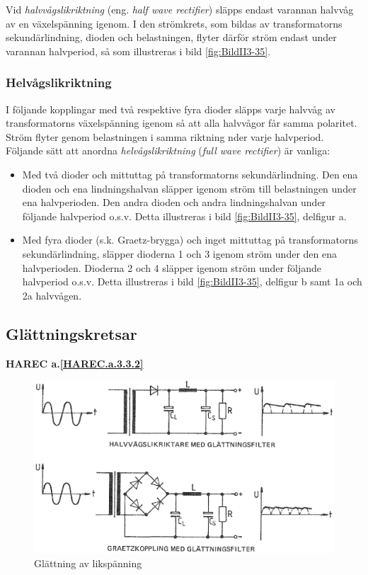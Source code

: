 Vid \emph{halvvågslikriktning} (eng. \emph{half wave rectifier}) släpps endast
varannan halvvåg av en växelspänning igenom.
I den strömkrets, som bildas av transformatorns sekundärlindning, dioden och
belastningen, flyter därför ström endast under varannan halvperiod, så som
illustreras i bild \ref{fig:BildII3-35}.

\subsubsection{Helvågslikriktning}

I följande kopplingar med två respektive fyra dioder släpps varje halvvåg av
transformatorns växelspänning igenom så att alla halvvågor får samma polaritet.
Ström flyter genom belastningen i samma riktning nder varje halvperiod.
Följande sätt att anordna \emph{helvågslikriktning}
(\emph{full wave rectifier}) är vanliga:
\begin{itemize}
\item Med två dioder och mittuttag på transformatorns sekundärlindning.
  Den ena dioden och ena lindningshalvan släpper igenom ström till belastningen
  under ena halvperioden.
  Den andra dioden och andra lindningshalvan under följande halvperiod o.s.v.
  Detta illustreras i bild \ref{fig:BildII3-35}, delfigur a.

\item Med fyra dioder (s.k. Graetz-brygga) och inget mittuttag på
  transformatorns sekundärlindning, släpper dioderna 1 och 3 igenom
  ström under den ena halvperioden.
  Dioderna 2 och 4 släpper igenom ström under följande halvperiod o.s.v.
  Detta illustreras i bild \ref{fig:BildII3-35}, delfigur b samt 1a och 2a
  halvvågen.
\end{itemize}

\subsection{Glättningskretsar}
\textbf{HAREC a.\ref{HAREC.a.3.3.2}\label{myHAREC.a.3.3.2}}

\begin{figure}
\includegraphics[width=\textwidth]{images/cropped_pdfs/bild_2_3-36.pdf}
\caption{Glättning av likspänning}
\label{fig:BildII3-36}
\end{figure}

